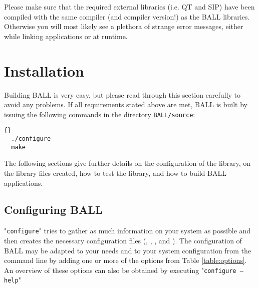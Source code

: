 Please make sure that the required external \CPP libraries (i.e. QT and SIP)
have been compiled with the same compiler (and compiler version!) as the BALL
libraries. Otherwise you will most likely see a plethora of strange error
messages, either while linking applications or at runtime.

\section{Installation}
\label{section:building-ball}

Building BALL is very easy, but please read through this section carefully to
avoid any problems.  If all requirements stated above are met, BALL is built
by issuing the following commands in the directory {\tt BALL/source}:

\begin{lstlisting}{}
  ./configure
  make
\end{lstlisting}

The following sections give further details on the configuration of the library,
on the library files created, how to test the library, and how to build BALL 
applications.

\subsection{Configuring BALL}

"{\tt configure}" tries to gather as much information on your system as possible and 
then creates the necessary configuration files (,
, , and ).
The configuration of BALL may be adapted to your needs and to your system
configuration from the command line by adding one or more of the options from
Table \ref{table:options}.
An overview of these options can also be obtained by executing "{\tt configure
--help}"

